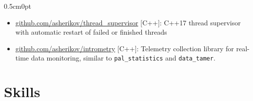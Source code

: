 \documentclass[a4paper,10pt]{report}
\newcommand{\cvurl}[2]{\href{#1://#2}{\url{#2}}}
\newenvironment{cvindent}{\begin{adjustwidth}{0.5cm}{0pt}}{\end{adjustwidth}}
\begin{document}
\begin{cvindent}
\begin{itemize}
        \item \cvurl{https}{github.com/asherikov/thread_supervisor} [C++]:
            C++17 thread supervisor with automatic restart of failed or
            finished threads

        \item \cvurl{https}{github.com/asherikov/intrometry} [C++]: Telemetry
            collection library for real-time data monitoring, similar to
            \verb|pal_statistics| and \verb|data_tamer|.
    \end{itemize}
\end{cvindent}


\vspace{0.15cm}
\section{Skills}
\end{document}
